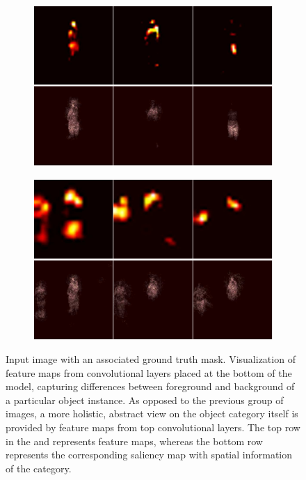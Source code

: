 \begin{figure}[t]
\begin{subfigure}[b]{0.13\textwidth}
        \caption[]{}
    \end{subfigure}
    \hfill
    \begin{subfigure}[b]{0.39\textwidth}
        \centering
        \includegraphics[width=\textwidth]{figures/theoretical_foundations/fully_cnn_tracking_feature_maps_2.pdf}
        \caption[]{}
    \end{subfigure}
    \hfill
    \begin{subfigure}[b]{0.39\textwidth}
        \centering
        \includegraphics[width=\textwidth]{figures/theoretical_foundations/fully_cnn_tracking_feature_maps_3.pdf}
        \caption[]{}
    \end{subfigure}
    \caption[Fully convolutional tracking]{ Input image with an associated ground truth mask.  Visualization of feature maps from convolutional layers placed at the bottom of the model, capturing differences between foreground and background of a particular object instance.  As opposed to the previous group of images, a more holistic, abstract view on the object category itself is provided by feature maps from top convolutional layers. The top row in the  and  represents feature maps, whereas the bottom row represents the corresponding saliency map with spatial information of the category. }
    \label{fig:FullyCNNTrackingFeatureMaps}
\end{figure}

